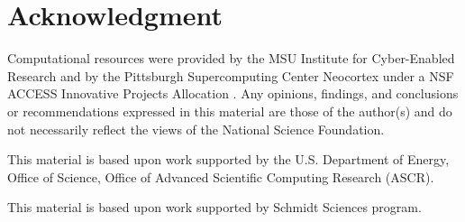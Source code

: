 \section*{Acknowledgment}
\begin{footnotesize}
Computational resources were provided by the MSU Institute for Cyber-Enabled Research and by the Pittsburgh Supercomputing Center Neocortex under a NSF ACCESS Innovative Projects Allocation \citep{buitrago2021neocortex,boerner2023pearc}.
Any opinions, findings, and conclusions or recommendations expressed in this material are those of the author(s) and do not necessarily reflect the views of the National Science Foundation.

This material is based upon work supported by the U.S. Department of Energy, Office of Science, Office of Advanced Scientific Computing Research (ASCR).

This material is based upon work supported by
Schmidt Sciences program.
\end{footnotesize}
